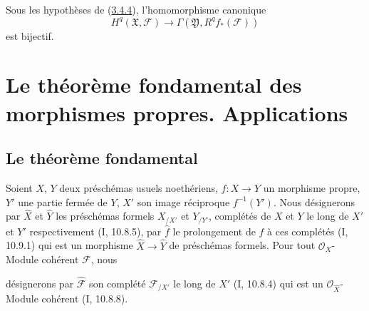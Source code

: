 \begin{corollary}[3.4.6]
\label{III.3.4.6-fr}
Sous les hypothèses de (\hyperref[III.3.4.4-fr]{3.4.4}), l'homomorphisme
canonique
\[
H^q(\mathfrak X,\mathcal F)
\longrightarrow\Gamma(\mathfrak Y,R^qf_*(\mathcal F))
\tag{3.4.6.1}\label{III.3.4.6.1-fr}
\]
est bijectif.
\end{corollary}

\section{Le théorème fondamental des morphismes propres. Applications}
\label{section:III.4-fr}

\subsection{Le théorème fondamental}
\label{subsection:III.4.1-fr}

\begin{env}[4.1.1]
\label{III.4.1.1-fr}
Soient $X$, $Y$ deux préschémas usuels noethériens, $f:X\to Y$ un
morphisme propre, $Y'$ une partie fermée de $Y$, $X'$ son image réciproque
$f^{-1}(Y')$. Nous désignerons par $\widehat X$ et $\widehat Y$ les
préschémas formels $X_{/X'}$ et $Y_{/Y'}$, complétés de $X$ et $Y$ le long
de $X'$ et $Y'$ respectivement (I, 10.8.5), par $\widehat f$ le prolongement
de $f$ à ces complétés (I, 10.9.1) qui est un morphisme
$\widehat X\to\widehat Y$ de préschémas formels. Pour tout
$\mathcal O_X$-Module cohérent $\mathcal F$, nous


désignerons par $\widehat{\mathcal F}$ son complété $\mathcal F_{/X'}$ le
long de $X'$ (I, 10.8.4) qui est un $\mathcal O_{\widehat X}$-Module
cohérent (I, 10.8.8).
\end{env}

